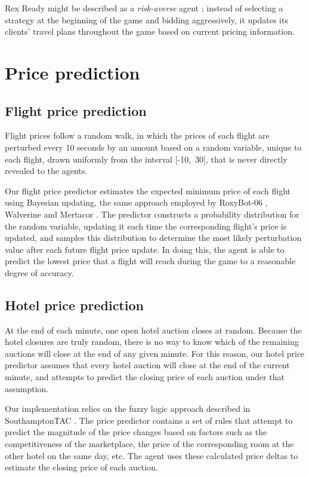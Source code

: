 \documentclass{acm_proc_article-sp}
\begin{document}
Rex Ready might be described as a \emph{risk-averse} agent \cite{SouthamptonTAC}; instead of selecting a strategy at the beginning of the game and bidding aggressively, it updates its clients' travel plans throughout the game based on current pricing information.

\section{Price prediction}

\subsection{Flight price prediction}

Flight prices follow a random walk, in which the prices of each flight are perturbed every 10 seconds by an amount based on a random variable, unique to each flight, drawn uniformly from the interval \mbox{[-10, 30]}, that is never directly revealed to the agents.

Our flight price predictor estimates the expected minimum price of each flight using Bayesian updating, the same approach employed by RoxyBot-06 \cite{RoxyBot}, Walverine \cite{Walverine} and Mertacor \cite{Mertacor}. The predictor constructs a probability distribution for the random variable, updating it each time the corresponding flight's price is updated, and samples this distribution to determine the most likely perturbation value after each future flight price update. In doing this, the agent is able to predict the lowest price that a flight will reach during the game to a reasonable degree of accuracy.

\subsection{Hotel price prediction}

At the end of each minute, one open hotel auction closes at random. Because the hotel closures are truly random, there is no way to know which of the remaining auctions will close at the end of any given minute. For this reason, our hotel price predictor assumes that every hotel auction will close at the end of the current minute, and attempts to predict the closing price of each auction under that assumption.

Our implementation relies on the fuzzy logic approach described in SouthamptonTAC \cite{SouthamptonTAC}. The price predictor contains a set of rules that attempt to predict the magnitude of the price changes based on factors such as the competitiveness of the marketplace, the price of the corresponding room at the other hotel on the same day, etc. The agent uses these calculated price deltas to estimate the closing price of each auction.
\end{document}
